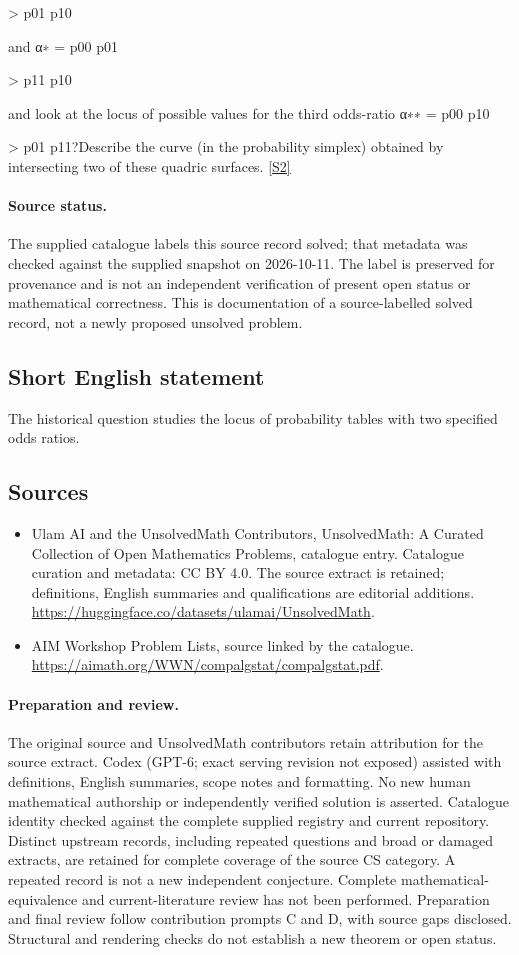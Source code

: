 \documentclass[11pt]{article}
\newcommand{\sref}[2]{\hyperlink{source:#1:#2}{[S#2]}}
\begin{document}
> p01 p10

and α∗ = p00 p01

> p11 p10

and look at the locus of possible values for the third odds-ratio α∗∗ = p00 p10

> p01 p11?Describe the curve (in the probability simplex) obtained by intersecting two of these quadric surfaces. \sref{statement}{2}
\paragraph{Source status.}
The supplied catalogue labels this source record solved; that metadata was checked against the supplied snapshot on 2026-10-11. The label is preserved for provenance and is not an independent verification of present open status or mathematical correctness. This is documentation of a source-labelled solved record, not a newly proposed unsolved problem.
\subsection{Short English statement}
The historical question studies the locus of probability tables with two specified odds ratios.
\subsection{Sources}
\begin{itemize}
\item[\hypertarget{source:statement:1}{S1}] Ulam AI and the UnsolvedMath Contributors, UnsolvedMath: A Curated Collection of Open Mathematics Problems, catalogue entry. Catalogue curation and metadata: CC BY 4.0. The source extract is retained; definitions, English summaries and qualifications are editorial additions.
\url{https://huggingface.co/datasets/ulamai/UnsolvedMath}.
\item[\hypertarget{source:statement:2}{S2}] AIM Workshop Problem Lists, source linked by the catalogue.
\url{https://aimath.org/WWN/compalgstat/compalgstat.pdf}.
\end{itemize}
\paragraph{Preparation and review.}
The original source and UnsolvedMath contributors retain attribution for the source extract. Codex (GPT-6; exact serving revision not exposed) assisted with definitions, English summaries, scope notes and formatting. No new human mathematical authorship or independently verified solution is asserted. Catalogue identity checked against the complete supplied registry and current repository. Distinct upstream records, including repeated questions and broad or damaged extracts, are retained for complete coverage of the source CS category. A repeated record is not a new independent conjecture. Complete mathematical-equivalence and current-literature review has not been performed. Preparation and final review follow contribution prompts C and D, with source gaps disclosed. Structural and rendering checks do not establish a new theorem or open status.
\label{end:statement}
\end{document}
